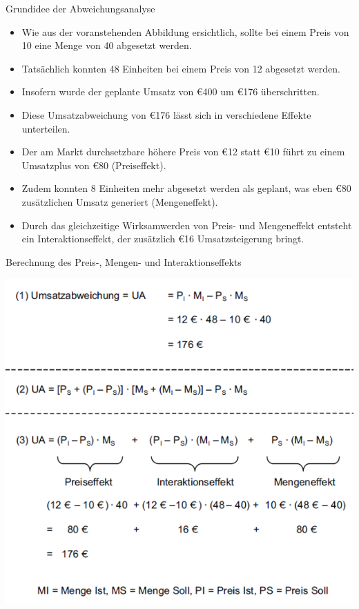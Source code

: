 \documentclass[12pt,ngerman,a4paper,ignorenonframetext,]{beamer}
\providecommand{\tightlist}{%
  \setlength{\itemsep}{0pt}\setlength{\parskip}{0pt}}
\begin{document}
\begin{frame}{Grundidee der Abweichungsanalyse}
\protect\hypertarget{grundidee-der-abweichungsanalyse}{}

\begin{itemize}
\tightlist
\item
  Wie aus der voranstehenden Abbildung ersichtlich, sollte bei einem
  Preis von 10 eine Menge von 40 abgesetzt werden.
\item
  Tatsächlich konnten 48 Einheiten bei einem Preis von 12 abgesetzt
  werden.
\item
  Insofern wurde der geplante Umsatz von €400 um €176 überschritten.
\item
  Diese Umsatzabweichung von €176 lässt sich in verschiedene Effekte
  unterteilen.
\item
  Der am Markt durchsetzbare höhere Preis von €12 statt €10 führt zu
  einem Umsatzplus von €80 (Preiseffekt).
\item
  Zudem konnten 8 Einheiten mehr abgesetzt werden als geplant, was eben
  €80 zusätzlichen Umsatz generiert (Mengeneffekt).
\item
  Durch das gleichzeitige Wirksamwerden von Preis- und Mengeneffekt
  entsteht ein Interaktionseffekt, der zusätzlich €16 Umsatzsteigerung
  bringt.
\end{itemize}

\end{frame}

\begin{frame}[shrink]{Berechnung des Preis-, Mengen- und
Interaktionseffekts}
\protect\hypertarget{berechnung-des-preis--mengen--und-interaktionseffekts}{}

\begin{center}\includegraphics[width=0.7\linewidth]{./images/Marketingcontrolling/Preismengeneffekt} \end{center}

\end{frame}
\end{document}
